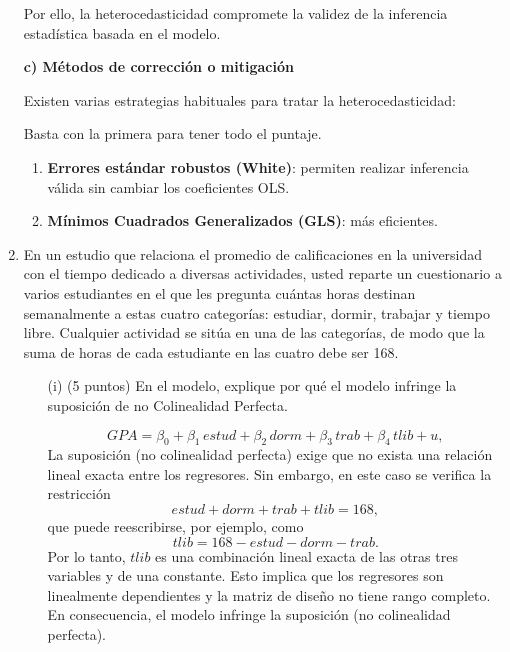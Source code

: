 \documentclass[10pt,a4paper]{article}
\begin{document}
\begin{enumerate}
{Por ello, la heterocedasticidad compromete la validez de la inferencia estadística basada en el modelo.

\vspace{0.6cm}

\textbf{c) Métodos de corrección o mitigación}

Existen varias estrategias habituales para tratar la heterocedasticidad:

Basta con la primera para tener todo el puntaje.
\begin{enumerate}
    \item \textbf{Errores estándar robustos (White)}: permiten realizar inferencia válida sin cambiar los coeficientes OLS.
    \item \textbf{Mínimos Cuadrados Generalizados (GLS)}: más eficientes. 
     \end{enumerate}
}

    \item En un estudio que relaciona el promedio de calificaciones en la universidad con el
tiempo dedicado a diversas actividades, usted reparte un cuestionario a varios estudiantes
en el que les pregunta cuántas horas destinan semanalmente a estas cuatro categorías:
estudiar, dormir, trabajar y tiempo libre. Cualquier actividad se sitúa en una de las
categorías, de modo que la suma de horas de cada estudiante en las cuatro debe ser 168.

\begin{enumerate}
    \item[(i)] (5 puntos) En el modelo, explique por qué el modelo infringe la suposición de no Colinealidad Perfecta.

    \[
        GPA = \beta_0 + \beta_1 \, estud + \beta_2 \, dorm + \beta_3 \, trab + \beta_4 \, tlib + u,
    \]
\color{blue}
La suposición (no colinealidad perfecta) exige que no exista una relación lineal exacta entre los regresores. Sin embargo, en este caso se verifica la restricción
    \[
        estud + dorm + trab + tlib = 168,
    \]
    que puede reescribirse, por ejemplo, como
    \[
        tlib = 168 - estud - dorm - trab.
    \]
    Por lo tanto, $tlib$ es una combinación lineal exacta de las otras tres variables y de una constante. Esto implica que los regresores son linealmente dependientes y la matriz de diseño no tiene rango completo. En consecuencia, el modelo infringe la suposición (no colinealidad perfecta).
\color{black}


\end{enumerate}
\end{enumerate}
\end{document}
